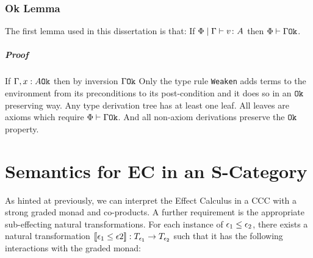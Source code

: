 \documentclass{Report}
\begin{document}
\subsection{Ok Lemma} The first lemma used in this dissertation is that: If $\Phi\mid\Gamma \vdash v \colon A$ then $\Phi\vdash \Gamma \texttt{Ok}$.
\paragraph{Proof}
If $\Gamma, x: A \texttt{Ok}$ then by inversion $\Gamma \texttt{Ok}$
Only the type rule \texttt{Weaken} adds terms to the environment from its preconditions to its post-condition and it does so in an $\texttt{Ok}$ preserving way. Any type derivation tree has at least one leaf. All leaves are axioms which require $\Phi\vdash \Gamma \texttt{Ok}$. And all non-axiom derivations preserve the $\texttt{Ok}$ property.


\chapter{Semantics for EC in an S-Category}
As hinted at previously, we can interpret the Effect Calculus in a CCC with a strong graded monad and co-products. A further requirement is the appropriate sub-effecting natural transformations. For each instance of $\epsilon_1 \leq \epsilon_2$, there exists a natural transformation ${\bf [\![}\epsilon_1\leq\epsilon2{\bf ]\!]}: T_{\epsilon_1}{}\rightarrow T_{\epsilon_2}{}$ such that it has the following interactions with the graded monad:

\qquad%
\end{document}
